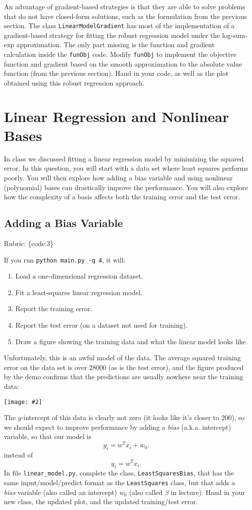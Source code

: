 \documentclass{article}
\def\rubric#1{\gre{Rubric: \{#1\}}}{}
\def\blu#1{{\color{blu}#1}}
\def\gre#1{{\color{gre}#1}}
\newcommand{\centerfig}[2]{\begin{center}\texttt{[image: \#2]}\end{center}}
\def\enum#1{\begin{enumerate}#1\end{enumerate}}
\begin{document}
An advantage of gradient-based strategies is that they are able to solve
problems that do not have closed-form solutions, such as the formulation from the
previous section. The class \texttt{LinearModelGradient} has most of the implementation
of a gradient-based strategy for fitting the robust regression model under the log-sum-exp approximation.
The only part missing is the function and gradient calculation inside the \texttt{funObj} code.
\blu{Modify \texttt{funObj} to implement the objective function and gradient based on the smooth
approximation to the absolute value function (from the previous section). Hand in your code, as well
as the plot obtained using this robust regression approach.}


\section{Linear Regression and Nonlinear Bases}

In class we discussed fitting a linear regression model by minimizing the squared error.
In this question, you will start with a data set where least squares performs poorly.
You will then explore how adding a bias variable and using nonlinear (polynomial) bases can drastically improve the performance.
You will also explore how the complexity of a basis affects both the training error and the test error.

\subsection{Adding a Bias Variable}
\label{biasvar}
\rubric{code:3}

If you run  \verb|python main.py -q 4|, it will:
\enum{
\item Load a one-dimensional regression dataset.
\item Fit a least-squares linear regression model.
\item Report the training error.
\item Report the test error (on a dataset not used for training).
\item Draw a figure showing the training data and what the linear model looks like.
}
Unfortunately, this is an awful model of the data. The average squared training error on the data set is over 28000
(as is the test error), and the figure produced by the demo confirms that the predictions are usually nowhere near
 the training data:
\centerfig{.5}{../figs/least_squares_no_bias.pdf}
The $y$-intercept of this data is clearly not zero (it looks like it's closer to $200$),
so we should expect to improve performance by adding a \emph{bias} (a.k.a. intercept) variable, so that our model is
\[
y_i = w^Tx_i + w_0.
\]
instead of
\[
y_i = w^Tx_i.
\]
\blu{In file \texttt{linear\string_model.py}, complete the class, \texttt{LeastSquaresBias},
that has the same input/model/predict format as the \texttt{LeastSquares} class,
but that adds a \emph{bias} variable (also called an intercept) $w_0$ (also called $\beta$ in lecture). Hand in your new class, the updated plot,
and the updated training/test error.}
\end{document}
